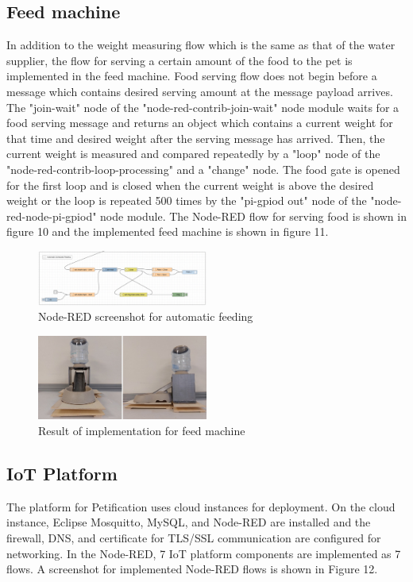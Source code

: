 ﻿\documentclass[conference]{IEEEtran}
\begin{document}
\subsection{Feed machine}
In addition to the weight measuring flow which is the same as that of the water supplier, the flow for serving a certain amount of the food to the pet is implemented in the feed machine.
Food serving flow does not begin before a message which contains desired serving amount at the message payload arrives.
The "join-wait" node of the "node-red-contrib-join-wait" node module waits for a food serving message and returns an object which contains a current weight for that time and desired weight after the serving message has arrived.
Then, the current weight is measured and compared repeatedly by a "loop" node of the "node-red-contrib-loop-processing" and a "change" node.
The food gate is opened for the first loop and is closed when the current weight is above the desired weight or the loop is repeated 500 times by the "pi-gpiod out" node of the "node-red-node-pi-gpiod" node module.
The Node-RED flow for serving food is shown in figure 10 and the implemented feed machine is shown in figure 11.

\begin{figure}[htbp]
\centerline{\includegraphics[width=0.5\textwidth]{./images/automaticFeeding.png}}
\caption{Node-RED screenshot for automatic feeding}
\label{fig}
\end{figure}

\begin{figure}[htbp]
\centerline{\includegraphics[width=0.5\textwidth]{./images/feed-machine.jpg}}
\caption{Result of implementation for feed machine}
\label{fig}
\end{figure}

\subsection{IoT Platform}
The platform for Petification uses cloud instances for deployment.
On the cloud instance, Eclipse Mosquitto, MySQL, and Node-RED are installed and the firewall, DNS, and certificate for TLS/SSL communication are configured for networking.
In the Node-RED, 7 IoT platform components are implemented as 7 flows.
A screenshot for implemented Node-RED flows is shown in Figure 12.
\end{document}
